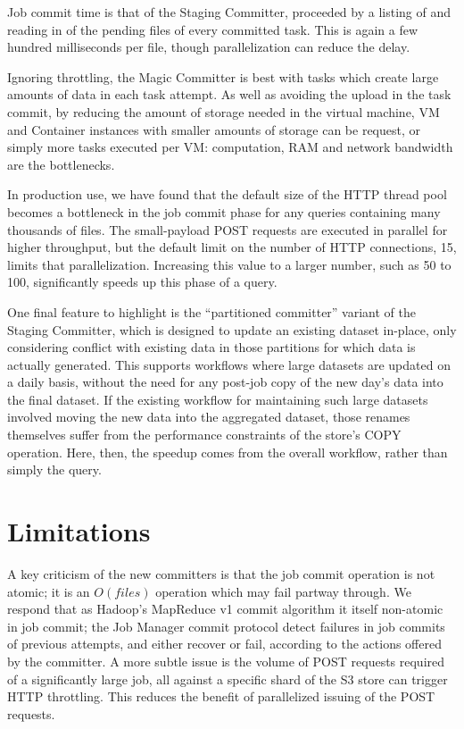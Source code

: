 \documentclass[format=acmsmall, screen=true, nonacm, timestamp, review=false]{acmart}
\begin{document}
Job commit time is that of the Staging Committer, proceeded by a listing
of and reading in of the pending files of every committed task.
This is again a few hundred milliseconds per file, though parallelization
can reduce the delay.

Ignoring throttling, the Magic Committer is best with tasks which create
large amounts of data in each task attempt.
As well as avoiding the upload in the task commit, by reducing the
amount of storage needed in the virtual machine, VM and Container instances
with smaller amounts of storage can be request, or simply more tasks executed
per VM: computation, RAM and network bandwidth are the bottlenecks.

In production use, we have found that the default size of the HTTP thread
pool becomes a bottleneck in the job commit phase for any queries
containing many thousands of files.
The small-payload POST requests are executed in parallel for higher
throughput, but the default limit on the number of HTTP connections, 15, 
limits that parallelization.
Increasing this value to a larger number, such as 50 to 100, significantly
speeds up this phase of a query.

One final feature to highlight is the ``partitioned committer'' variant
of the Staging Committer, which is designed to update an existing
dataset in-place, only considering conflict with existing data in
those partitions for which data is actually generated.
This supports workflows where large datasets are updated on a daily basis,
without the need for any post-job copy of the new day's data into the
final dataset.
If the existing workflow for maintaining such large datasets involved
moving the new data into the aggregated dataset, those renames themselves
suffer from the performance constraints of the store's COPY operation.
Here, then, the speedup comes from the overall workflow, rather than
simply the query.



\section{Limitations}
\label{sec:limitations}

A key criticism of the new committers is that the job commit operation is not atomic;
it is an $O(files)$ operation which may fail partway through.
We respond that as Hadoop's MapReduce v1 commit algorithm it itself non-atomic in job commit;
the Job Manager commit protocol detect failures in job commits
of previous attempts, and either recover or fail, according to the actions
offered by the committer.
A more subtle issue is the volume of POST requests required of a significantly large job,
all against a specific shard of the S3 store can trigger HTTP throttling.
This reduces the benefit of parallelized issuing of the POST requests.
\end{document}
